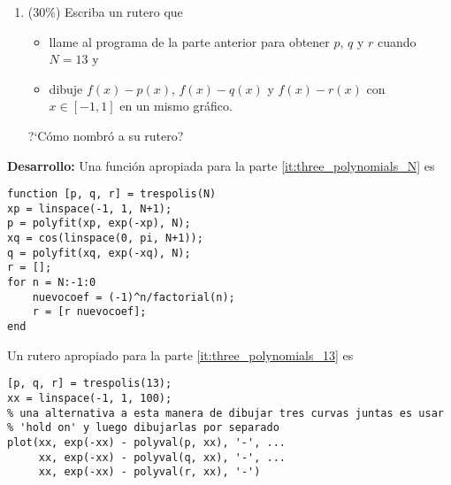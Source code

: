 \begin{enumerate}
\bigskip

\item\label{it:three_polynomials_13} (30\%) Escriba un rutero \matlab que
\begin{itemize}
\item llame al programa de la parte anterior para obtener $p$, $q$ y $r$ cuando $N = 13$ y
\item dibuje $f(x) - p(x)$, $f(x) - q(x)$ y $f(x) - r(x)$ con $x \in [-1, 1]$ en un mismo gr\'afico.
\end{itemize}

\medskip
\noindent ?`C\'omo nombr\'o a su rutero?\newline
{}
\end{enumerate}

\textbf{Desarrollo:} Una funci\'on apropiada para la parte \ref{it:three_polynomials_N} es
\begin{lstlisting}
function [p, q, r] = trespolis(N)
xp = linspace(-1, 1, N+1);
p = polyfit(xp, exp(-xp), N);
xq = cos(linspace(0, pi, N+1));
q = polyfit(xq, exp(-xq), N);
r = [];
for n = N:-1:0
    nuevocoef = (-1)^n/factorial(n);
    r = [r nuevocoef];
end
\end{lstlisting}

Un rutero apropiado para la parte \ref{it:three_polynomials_13} es
\begin{lstlisting}
[p, q, r] = trespolis(13);
xx = linspace(-1, 1, 100);
% una alternativa a esta manera de dibujar tres curvas juntas es usar
% 'hold on' y luego dibujarlas por separado
plot(xx, exp(-xx) - polyval(p, xx), '-', ...
     xx, exp(-xx) - polyval(q, xx), '-', ...
     xx, exp(-xx) - polyval(r, xx), '-')
\end{lstlisting}



